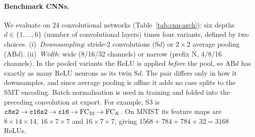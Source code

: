 \paragraph{Benchmark CNNs.}
We evaluate on 24 convolutional networks (Table~\ref{tab:cnn-arch}): six depths
$d \in \{1,\dots,6\}$ (number of convolutional layers) times four variants, defined by two choices.
(i)~\emph{Downsampling}: stride-2 convolutions (\textsf{S}$d$) or $2{\times}2$ average pooling
(\textsf{AB}$d$).
(ii)~\emph{Width}: wide (8/16/32 channels) or narrow (prefix \textsf{N}, 4/8/16 channels).
In the pooled variants the ReLU is applied \emph{before} the pool, so \textsf{AB}$d$ has exactly
as many ReLU neurons as its twin \textsf{S}$d$. The pair differs only in how it downsamples, and
since average pooling is affine it adds no case splits to the SMT encoding.
Batch normalisation is used in training and folded into the preceding convolution at export.
For example, \textsf{S3} is $\texttt{c8s2}\to\texttt{c16s2}\to\texttt{c16}\to\text{FC}_{32}\to\text{FC}_K$. On MNIST
its feature maps are $8{\times}14{\times}14$, $16{\times}7{\times}7$ and $16{\times}7{\times}7$,
giving $1568+784+784+32 = 3168$ ReLUs.

